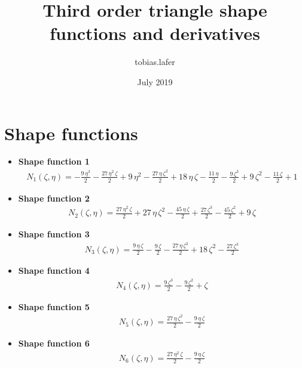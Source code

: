 \documentclass{article}
\title{Third order triangle shape functions and derivatives}
\author{tobias.lafer }
\date{July 2019}
\begin{document}
\maketitle
\newpage
\tableofcontents
\newpage

\section{Shape functions}

\begin{itemize}
    
\item \textbf{Shape function 1}\newline
\begin{align}
    N_1(\zeta, \eta) = -\frac{9\,\eta ^3}{2}-\frac{27\,\eta ^2\,\zeta}{2}+9\,\eta ^2-\frac{27\,\eta \,{\zeta}^2}{2}+18\,\eta \,\zeta-\frac{11\,\eta }{2}-\frac{9\,{\zeta}^3}{2}+9\,{\zeta}^2-\frac{11\,\zeta}{2}+1
\end{align}


\item \textbf{Shape function 2}\newline
\begin{align}
    N_2(\zeta, \eta) = \frac{27\,\eta ^2\,\zeta}{2}+27\,\eta \,{\zeta}^2-\frac{45\,\eta \,\zeta}{2}+\frac{27\,{\zeta}^3}{2}-\frac{45\,{\zeta}^2}{2}+9\,\zeta
\end{align}


\item \textbf{Shape function 3}\newline
\begin{align}
    N_3(\zeta, \eta) = \frac{9\,\eta \,\zeta}{2}-\frac{9\,\zeta}{2}-\frac{27\,\eta \,{\zeta}^2}{2}+18\,{\zeta}^2-\frac{27\,{\zeta}^3}{2}
\end{align}


\item \textbf{Shape function 4}\newline
\begin{align}
    N_4(\zeta, \eta) = \frac{9\,{\zeta}^3}{2}-\frac{9\,{\zeta}^2}{2}+\zeta
\end{align}


\item \textbf{Shape function 5}\newline
\begin{align}
    N_5(\zeta, \eta) = \frac{27\,\eta \,{\zeta}^2}{2}-\frac{9\,\eta \,\zeta}{2}
\end{align}


\item \textbf{Shape function 6}\newline
\begin{align}
    N_6(\zeta, \eta) = \frac{27\,\eta ^2\,\zeta}{2}-\frac{9\,\eta \,\zeta}{2}
\end{align}



\end{itemize}
\end{document}
